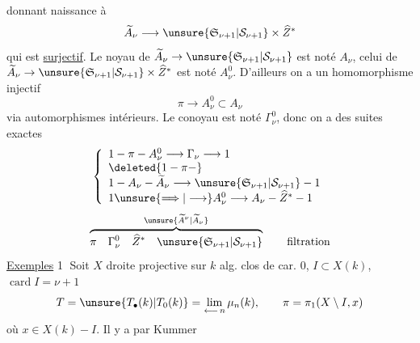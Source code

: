 donnant naissance à
\[\widetilde A_\nu\longrightarrow\unsure{\mathfrak S_{\nu+1}|\mathcal S_{\nu+1}}\times\widehat Z^*\]
qui est \uline{surjectif}. Le noyau de
$\widetilde A_\nu\to\unsure{\mathfrak S_{\nu+1}|\mathcal S_{\nu+1}}$
est noté $A_\nu$, celui de
$\widetilde A_\nu\to\unsure{\mathfrak S_{\nu+1}|\mathcal S_{\nu+1}}\times\widehat Z^*$
est noté $A_\nu^0$. D'ailleurs on a
un homomorphisme injectif
\[\pi\longrightarrow A_\nu^0\subset A_\nu\]
via automorphismes intérieurs. Le conoyau
est \deleted{$\unsure{\pi}$} noté $\Gamma_\nu^0$, donc on a des
suites exactes
\[\left\{\begin{array}{l}
1\mathbin{-}\pi\mathbin{-}A_\nu^0\longrightarrow\Gamma_\nu\longrightarrow1\\
\deleted{1\mathbin{-}\pi\mathbin{-}}\\
1\mathbin{-}A_\nu\mathbin{-}\widetilde A_\nu\longrightarrow\unsure{\mathfrak S_{\nu+1}|\mathcal S_{\nu+1}}\mathbin{-}1\\
1\unsure{\Longrightarrow|\longrightarrow}A_\nu^0\longrightarrow A_\nu\mathbin{-}\widehat Z^*\mathbin{-}1
\end{array}\right.\]
\[\overbrace{\pi\quad\Gamma_\nu^0\quad\widehat Z^*\quad\unsure{\mathfrak S_{\nu+1}|\mathcal S_{\nu+1}}}^{\unsure{\widetilde A^\nu|\widetilde A_\nu}}\qquad\text{filtration}\]
\uline{Exemples} \textcircled{1} Soit $X$ droite projective sur
$k$ alg. clos de car. $0$, $I\subset X(k)$, $\operatorname{card}I=\nu+1$
\[T=\unsure{T_\bullet(k)|T_0(k)}=\lim_{\longleftarrow\,n}\mu_n(k),\qquad\pi=\pi_1(X\setminus I,x)\]
où $x\in X(k)-I$. Il  y a par Kummer
